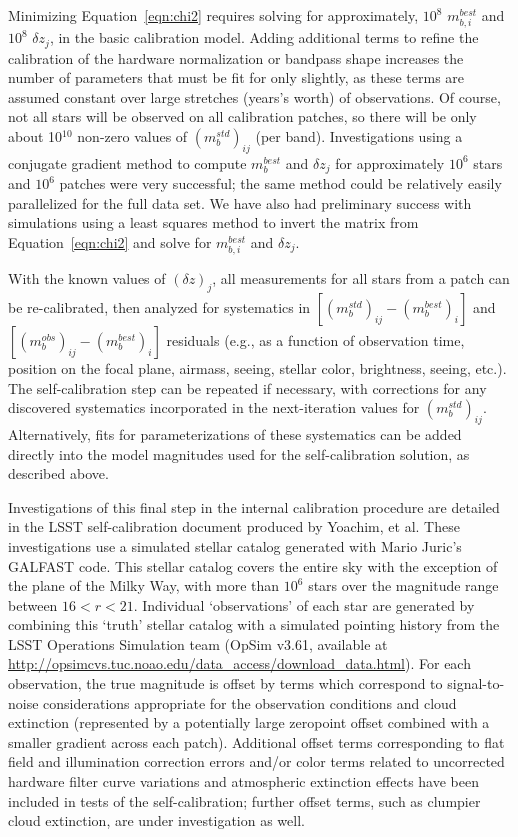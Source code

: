 \documentclass[12pt,preprint]{aastex}
\begin{document}
Minimizing Equation~\ref{eqn:chi2} requires solving for
approximately, $10^8$ $m_{b,i}^{best}$ and $10^8$ $\delta z_j$, in the
basic calibration model. Adding additional terms to refine the
calibration of the hardware normalization or bandpass shape increases
the number of parameters that must be fit for only slightly, as these
terms are assumed constant over large stretches (years's worth) of observations. Of
course, not all stars will be observed on all calibration patches, so
there will be only about 10$^{10}$ non-zero values of
$(m_b^{std})_{ij}$ (per band). Investigations using a conjugate
gradient method to compute $m_{b}^{best}$ and $\delta z_j$ for
approximately $10^6$ stars and $10^6$ patches were very successful; the
same method could be relatively easily parallelized for the full data
set.  We have also had preliminary success with simulations using a least squares
method to invert the matrix from Equation~\ref{eqn:chi2} and solve for $m_{b,i}^{best}$ and $\delta z_j$. 

With the known values of $(\delta z)_j$, all measurements for all
stars from a patch can be re-calibrated, then analyzed for systematics
in $[(m_b^{std})_{ij} - (m_b^{best})_{i}]$ and $[(m_b^{obs})_{ij} -
(m_b^{best})_{i}]$ residuals (e.g., as a function of observation time,
position on the focal plane, airmass, seeing, stellar color,
brightness, seeing, etc.). The self-calibration step can be repeated
if necessary, with corrections for any discovered systematics
incorporated in the next-iteration values for
$(m_b^{std})_{ij}$. Alternatively, fits for parameterizations of these
systematics can be added directly into the model magnitudes used for
the self-calibration solution, as described above.

Investigations of this final step in the internal calibration procedure are
detailed in the LSST self-calibration document produced by Yoachim, et al. These investigations use a
simulated stellar catalog generated with Mario Juric's GALFAST
code. This stellar catalog covers the entire sky with the exception of
the plane of the Milky Way, with more than $10^6$ stars over the
magnitude range between $16<r<21$.  Individual `observations' of each
star are generated by combining this `truth' stellar catalog with a
simulated pointing history from the LSST Operations Simulation team
(OpSim v3.61, available at
\url{http://opsimcvs.tuc.noao.edu/data_access/download_data.html}). For
each observation, the true magnitude is offset by terms which
correspond to signal-to-noise considerations appropriate for the
observation conditions and cloud extinction (represented by a
potentially large zeropoint offset combined with a smaller gradient
across each patch). Additional offset terms corresponding to flat
field and illumination correction errors and/or color terms related to
uncorrected hardware filter curve variations and atmospheric
extinction effects have been included in tests of the self-calibration;
further offset terms, such as clumpier cloud extinction, are under
investigation as well.
\end{document}
